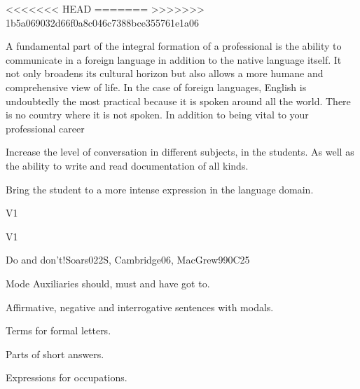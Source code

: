 \begin{syllabus}

<<<<<<< HEAD
=======
>>>>>>> 1b5a069032d66f0a8c046c7388bce355761e1a06

\begin{justification}
A fundamental part of the integral formation of a professional is the ability to communicate in a foreign language in addition to the native language itself. It not only broadens its cultural horizon but also allows a more humane and comprehensive view of life. In the case of foreign languages, English is undoubtedly the most practical because it is spoken around
all the world. There is no country where it is not spoken. In addition to being vital to your professional career
\end{justification}

\begin{goals}
\item Increase the level of conversation in different subjects, in the students. As well as the ability to write and read documentation of all kinds.
\item Bring the student to a more intense expression in the language domain.
\end{goals}

\begin{outcomes}{V1}
\item {}
\end{outcomes}

\begin{competences}{V1}
\item {}
\end{competences}

\begin{unit}{Do and don't!}{}{Soars022S, Cambridge06, MacGrew99}{0}{C25}
   \begin{topics}
      \item Mode Auxiliaries should, must and have got to.
      \item Affirmative, negative and interrogative sentences with modals.
      \item Terms for formal letters.
      \item Parts of short answers.
      \item Expressions for occupations.
   \end{topics}


\end{unit}
\end{syllabus}
